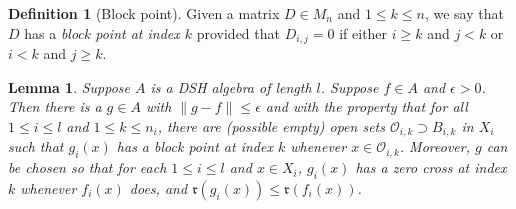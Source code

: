 \documentclass[12pt]{amsart}
\numberwithin{equation}{section}
\newtheorem{lemma}[theorem]{Lemma}
\theoremstyle{definition}
\newtheorem{definition}[theorem]{Definition}
\theoremstyle{remark}
\begin{document}
\begin{definition}[Block point]
	Given a matrix $D\in M_{n}$ and $1\leq k\leq n$, we say that $D$ has a \textit{block point at index $k$} provided that $D_{i,j}=0$ if either $i\geq k$ and $j<k$ or $i<k$ and $j\geq k$. 
\end{definition}

\begin{lemma}
	\label{block on set}
	Suppose $A$ is a DSH algebra of length $ l $. Suppose $f\in A$ and $\epsilon>0$. Then there is a $g\in A$ with $\|g-f\|\leq \epsilon$ and with the property that for all $1\leq i\leq  l $ and $1\leq k\leq n_{i}$, there are (possible empty) open sets $\mathcal{O}_{i,k}\supset B_{i,k}$ in $X_{i}$ such that $g_{i}(x)$ has a block point at index $k$ whenever $x\in \mathcal{O}_{i,k}$. Moreover, $g$ can be chosen so that for each $1\leq i\leq l $ and $x\in X_{i}$, $g_{i}(x)$ has a zero cross at index $k$ whenever $f_{i}(x)$ does, and $\mathfrak{r}(g_{i}(x))\leq \mathfrak{r}(f_{i}(x))$. 
\end{lemma}
\end{document}
